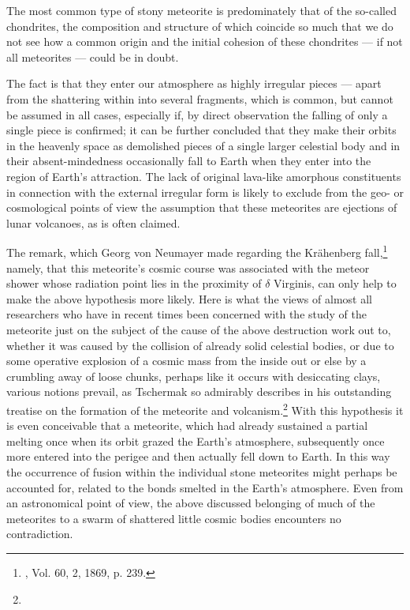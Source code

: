 \documentclass[a4paper, 12pt, oneside]{article}
\begin{document}
The most common type of stony meteorite is predominately that of the so-called chondrites, the composition and structure of which coincide so much that we do not see how a common origin and the initial cohesion of these chondrites --- if not all meteorites --- could be in doubt.

The fact is that they enter our atmosphere as highly irregular pieces --- apart from the shattering within into several fragments, which is common, but cannot be assumed in all cases, especially if, by direct observation the falling of only a single piece is confirmed; it can be further concluded that they make their orbits in the heavenly space as demolished pieces of a single larger celestial body and in their absent-mindedness occasionally fall to Earth when they enter into the region of Earth's attraction. The lack of original lava-like amorphous constituents in connection with the external irregular form is likely to exclude from the geo- or cosmological points of view the assumption that these meteorites are ejections of lunar volcanoes, as is often claimed.

The remark, which Georg von Neumayer made regarding the Krähenberg fall,\footnote{, Vol. 60, 2, 1869, p. 239.} namely, that this meteorite's cosmic course was associated with the meteor shower whose radiation point lies in the proximity of $\delta$ Virginis, can only help to make the above hypothesis more likely. Here is what the views of almost all researchers who have in recent times been concerned with the study of the meteorite just on the subject of the cause of the above destruction work out to, whether it was caused by the collision of already solid celestial bodies, or due to some operative explosion of a cosmic mass from the inside out or else by a crumbling away of loose chunks, perhaps like it occurs with desiccating clays, various notions prevail, as Tschermak so admirably describes in his outstanding treatise on the formation of the meteorite and volcanism.\footnote{} With this hypothesis it is even conceivable that a meteorite, which had already sustained a partial melting once when its orbit grazed the Earth's atmosphere, subsequently once more entered into the perigee and then actually fell down to Earth. In this way the occurrence of fusion within the individual stone meteorites might perhaps be accounted for, related to the bonds smelted in the Earth's atmosphere. Even from an astronomical point of view, the above discussed belonging of much of the meteorites to a swarm of shattered little cosmic bodies encounters no contradiction.
\end{document}
